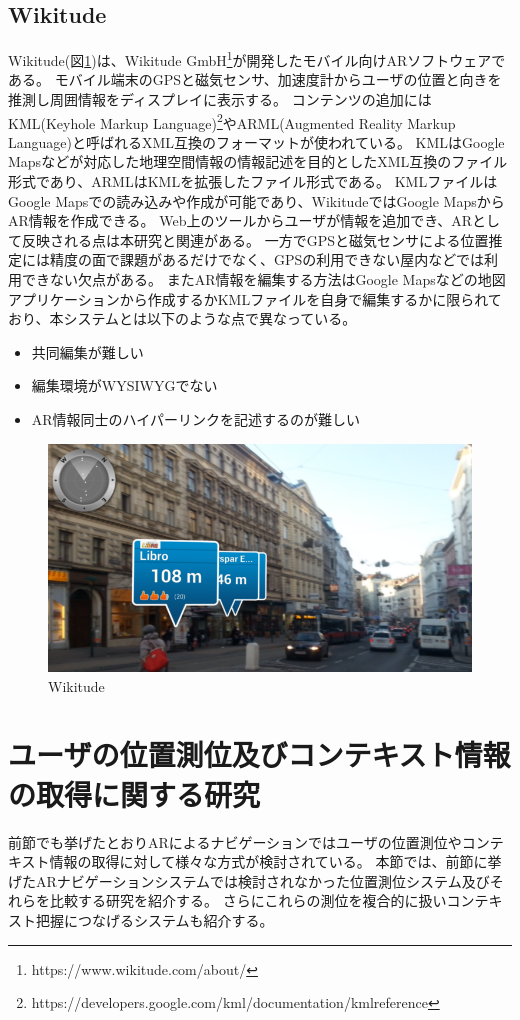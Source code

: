 \subsection{Wikitude}
Wikitude(図\ref{fig:Wikitude})は、Wikitude GmbH\footnote{\textsf{https://www.wikitude.com/about/}}が開発したモバイル向けARソフトウェアである。
モバイル端末のGPSと磁気センサ、加速度計からユーザの位置と向きを推測し周囲情報をディスプレイに表示する。
コンテンツの追加にはKML(Keyhole Markup Language)\footnote{\textsf{https://developers.google.com/kml/documentation/kmlreference}}やARML(Augmented Reality Markup Language)と呼ばれるXML互換のフォーマットが使われている。
KMLはGoogle Mapsなどが対応した地理空間情報の情報記述を目的としたXML互換のファイル形式であり、ARMLはKMLを拡張したファイル形式である。
KMLファイルはGoogle Mapsでの読み込みや作成が可能であり、WikitudeではGoogle MapsからAR情報を作成できる。
Web上のツールからユーザが情報を追加でき、ARとして反映される点は本研究と関連がある。
一方でGPSと磁気センサによる位置推定には精度の面で課題があるだけでなく、GPSの利用できない屋内などでは利用できない欠点がある。
またAR情報を編集する方法はGoogle Mapsなどの地図アプリケーションから作成するかKMLファイルを自身で編集するかに限られており、本システムとは以下のような点で異なっている。
\begin{itemize}
  \item 共同編集が難しい
  \item 編集環境がWYSIWYGでない
  \item AR情報同士のハイパーリンクを記述するのが難しい
\end{itemize}

\begin{figure}[H]
  \centering 
  \includegraphics[width=120mm]{images/Wikitude.png}
  \caption{Wikitude} \label{fig:Wikitude}
\end{figure}



\section{ユーザの位置測位及びコンテキスト情報の取得に関する研究}
前節でも挙げたとおりARによるナビゲーションではユーザの位置測位やコンテキスト情報の取得に対して様々な方式が検討されている。
本節では、前節に挙げたARナビゲーションシステムでは検討されなかった位置測位システム及びそれらを比較する研究を紹介する。
さらにこれらの測位を複合的に扱いコンテキスト把握につなげるシステムも紹介する。

